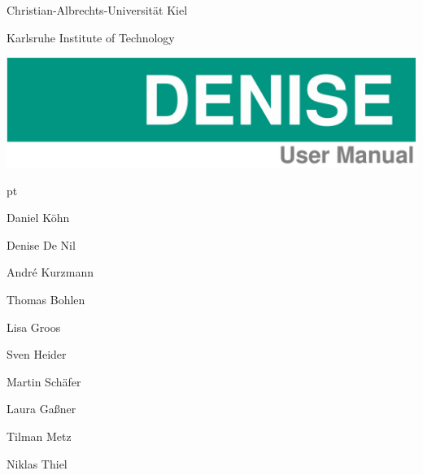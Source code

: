 \thispagestyle{empty}

\sffamily
\noindent
Christian-Albrechts-Universität Kiel

\noindent
Karlsruhe Institute of Technology
\newline

\noindent\includegraphics[width=1.0\textwidth]{DENISE_title1.png}

\begin{center}
\begin{minipage}[t]{1.00\textwidth}
\begingroup
{} pt
\begin{minipage}[h]{0.2\textwidth}

\vspace{7cm}

Daniel K\"ohn

Denise De Nil

Andr\'{e} Kurzmann

Thomas Bohlen

Lisa Groos

Sven Heider

Martin Sch\"afer

Laura Ga\ss ner

Tilman Metz

Niklas Thiel

\end{minipage}
\hfill
\begin{minipage}[h]{0.65\textwidth}


\end{minipage}
\end{minipage}
\end{center}
